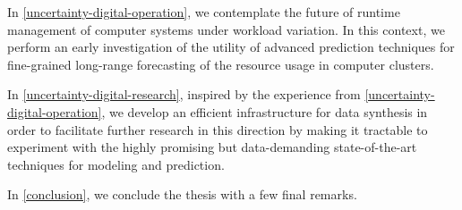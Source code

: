 In \cref{uncertainty-digital-operation}, we contemplate the future of runtime
management of computer systems under workload variation. In this context, we
perform an early investigation of the utility of advanced prediction techniques
for fine-grained long-range forecasting of the resource usage in computer
clusters.

In \cref{uncertainty-digital-research}, inspired by the experience from
\cref{uncertainty-digital-operation}, we develop an efficient infrastructure for
data synthesis in order to facilitate further research in this direction by
making it tractable to experiment with the highly promising but data-demanding
state-of-the-art techniques for modeling and prediction.

In \cref{conclusion}, we conclude the thesis with a few final remarks.
